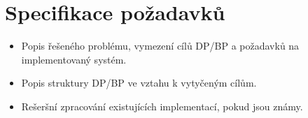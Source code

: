 \chapter{Specifikace požadavků}


%

\begin{itemize}

\item Popis řešeného problému, vymezení cílů DP/BP a požadavků na implementovaný systém.

%
%
%

\item Popis struktury DP/BP ve vztahu k vytyčeným cílům.

\item Rešeršní zpracování existujících implementací, pokud jsou známy.

\end{itemize}
